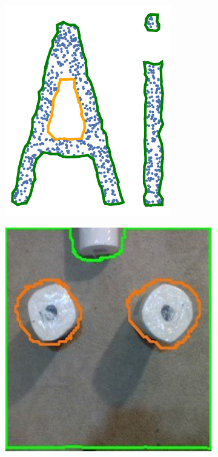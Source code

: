 \begin{figure}[t]
\begin{subfigure}{.25\linewidth}
    \includegraphics[clip, trim=0.0cm 0.1cm 0.0cm 0.25cm, width=.99\linewidth]{chapter_2_polylidar/imgs/concave_vs_convex_2.pdf}
    \caption{}
    \label{fig:ch2_concave}
  \end{subfigure}
  \begin{subfigure}{.25\linewidth}
    \centering
    \includegraphics[width=0.99\linewidth]{chapter_2_polylidar/imgs/RealSensePictures-cropped_aspect.pdf}

\end{subfigure}
\end{figure}
